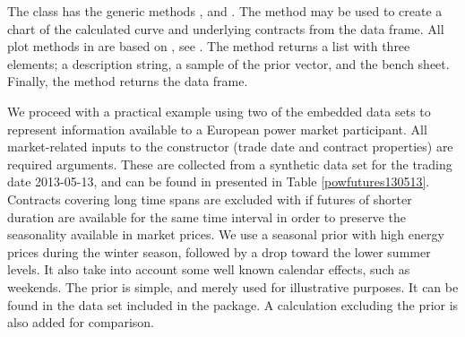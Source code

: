 The  class has the generic methods ,  and . The  method may be used to create a chart of the calculated curve and underlying contracts from the  data frame. All plot methods in  are based on , see \citet{wickham2011ggplot2}. The  method returns a list with three elements; a description string, a sample of the prior vector, and the bench sheet. Finally, the  method returns the  data frame. 

We proceed with a practical example using two of the embedded  data sets to represent information available to a European power market participant.  All market-related inputs to the  constructor (trade date and contract properties) are required arguments. These are collected from a synthetic data set for the trading date 2013-05-13, and can be found in  presented in Table \ref{powfutures130513}. Contracts covering long time spans are excluded with  if futures of shorter duration are available for the same time interval in order to preserve the seasonality available in market prices. We use a seasonal prior with high energy prices during the winter season, followed by a drop toward the lower summer levels. It also take into account some well known calendar effects,  such as weekends. The prior is simple, and merely used for illustrative purposes. It can be found in the data set  included in the package. A calculation excluding the prior is also added for comparison.

